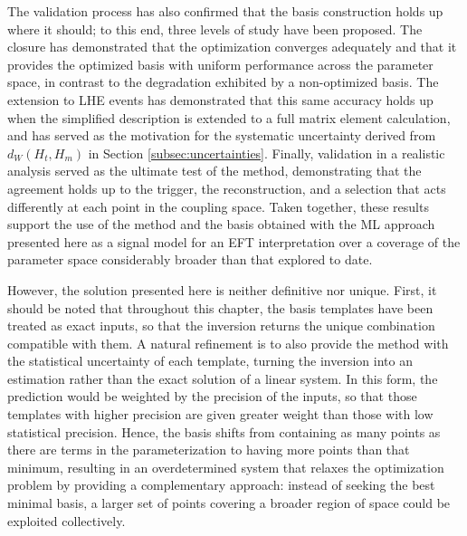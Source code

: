 The validation process has also confirmed that the basis construction holds up where it should; to this end, three levels of study have been proposed. The closure has demonstrated that the optimization converges adequately and that it provides the optimized basis with uniform performance across the parameter space, in contrast to the degradation exhibited by a non-optimized basis. The extension to LHE events has demonstrated that this same accuracy holds up when the simplified description is extended to a full matrix element calculation, and has served as the motivation for the systematic uncertainty derived from $d_W(H_{t},H_{m})$ in Section \ref{subsec:uncertainties}. Finally, validation in a realistic analysis served as the ultimate test of the method, demonstrating that the agreement holds up to the trigger, the reconstruction, and a selection that acts differently at each point in the coupling space. Taken together, these results support the use of the method and the basis obtained with the ML approach presented here as a signal model for an EFT interpretation over a coverage of the parameter space considerably broader than that explored to date.\medskip


However, the solution presented here is neither definitive nor unique. First, it should be noted that throughout this chapter, the basis templates have been treated as exact inputs, so that the inversion returns the unique combination compatible with them. A natural refinement is to also provide the method with the statistical uncertainty of each template, turning the inversion into an estimation rather than the exact solution of a linear system. In this form, the prediction would be weighted by the precision of the inputs, so that those templates with higher precision are given greater weight than those with low statistical precision. Hence, the basis shifts from containing as many points as there are terms in the parameterization to having more points than that minimum, resulting in an overdetermined system that relaxes the optimization problem by providing a complementary approach: instead of seeking the best minimal basis, a larger set of points covering a broader region of space could be exploited collectively.

